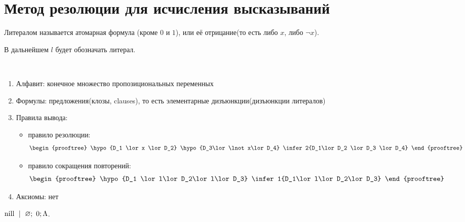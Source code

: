\documentclass[main]{subfiles}
\begin{document}
\chapter{Метод резолюции для исчисления высказываний}
\begin{definition}[Литерал]
    Литералом называется атомарная формула (кроме $0$ и $1$), или её отрицание(то есть либо $x$, либо $\lnot x$).
\end{definition}
В дальнейшем $l$ будет обозначать литерал.
\begin{definition}
    \

    \begin{enumerate}
        \item Алфавит: конечное множество пропозициональных переменных
        \item Формулы: предложения(клозы, clauses), то есть элементарные дизъюнкции(дизъюнкции литералов)
        \item Правила вывода:
              \begin{itemize}
                  \item правило резолюции:
                        \begin{gather*}
                            \begin{prooftree}
                                \hypo{D_1 \lor x \lor D_2}
                                \hypo{D_3\lor \lnot x\lor D_4}
                                \infer2{D_1\lor D_2 \lor D_3 \lor D_4}
                            \end{prooftree}
                        \end{gather*}
                  \item правило сокращения повторений:
                        \begin{gather*}
                            \begin{prooftree}
                                \hypo{D_1 \lor l\lor D_2\lor l\lor D_3}
                                \infer1{D_1\lor l\lor D_2\lor D_3}
                            \end{prooftree}
                        \end{gather*}
              \end{itemize}
        \item Аксиомы: нет
    \end{enumerate}
\end{definition}
\begin{definition}
    $\mathrm{nill}\ \mid \ \varnothing; \ 0; \Lambda$.
\end{definition}
\end{document}
